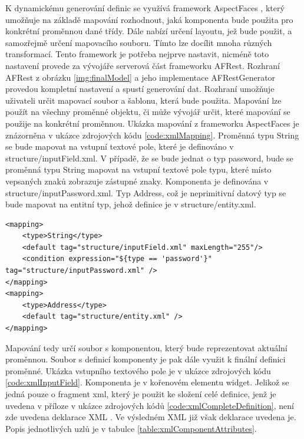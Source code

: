K dynamickému generování definic se využívá framework AspectFaces \cite{aspectfaces}, který umožňuje na základě mapování rozhodnout, jaká komponenta bude použita pro konkrétní proměnnou dané třídy. Dále nabízí určení layoutu, jež bude použit, a samozřejmě určení mapovacího souboru. Tímto lze docílit mnoha různých transformací. Tento framework je potřeba nejprve nastavit, nicméně toto nastavení provede za vývojáře serverová část frameworku AFRest. Rozhraní AFRest z obrázku \ref{img:finalModel} a jeho implementace AFRestGenerator provedou kompletní nastavení a spustí generování dat. Rozhraní umožňuje uživateli určit mapovací soubor a šablonu, která bude použita. Mapování lze použít na všechny proměnné objektu, či může vývojář určit, které mapování se použije na konkrétní proměnnou. Ukázka mapování z frameworku AspectFaces je znázorněna v ukázce zdrojových kódu \ref{code:xmlMapping}. Proměnná typu String se bude mapovat na vstupní textové pole, které je definováno v structure/inputField.xml. V případě, že se bude jednat o typ password, bude se proměnná typu String mapovat na vstupní textové pole typu, které místo vepsaných znaků zobrazuje zástupné znaky. Komponenta je definována v structure/inputPassword.xml. Typ Address, což je neprimitivní datový typ se bude mapovat na entitní typ, jehož definice je v structure/entity.xml.
\begin{lstlisting}[caption=Ukázka mapování proměnných na komponenty,
label={code:xmlMapping}, basicstyle=\footnotesize]
<mapping>
	<type>String</type>
	<default tag="structure/inputField.xml" maxLength="255"/>
	<condition expression="${type == 'password'}" tag="structure/inputPassword.xml" />
</mapping>
<mapping>
	<type>Address</type>
	<default tag="structure/entity.xml" />
</mapping>
\end{lstlisting}

Mapování tedy určí soubor s komponentou, který bude reprezentovat aktuální proměnnou. Soubor s definicí komponenty je pak dále využit k finální definici proměnné. Ukázka vstupního textového pole je v ukázce zdrojových kódu \ref{code:xmlInputField}. Komponenta je v kořenovém elementu widget. Jelikož se jedná pouze o fragment xml, který je použit ke složení celé definice, jenž je uvedena v příloze v ukázce zdrojových kódů \ref{code:xmlCompleteDefinition}, není zde uvedena deklarace XML \cite{xml}. Ve výsledném XML již však deklarace uvedena je. Popis jednotlivých uzlů je v tabulce \ref{table:xmlComponentAttributes}.

